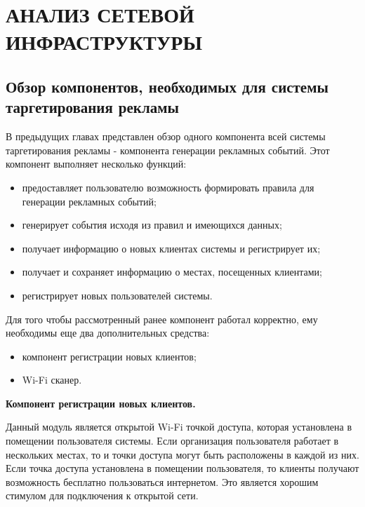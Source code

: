 \chapter{АНАЛИЗ СЕТЕВОЙ ИНФРАСТРУКТУРЫ}

\section{Обзор компонентов, необходимых для системы таргетирования рекламы}

В предыдущих главах представлен обзор одного компонента всей системы таргетирования рекламы - компонента генерации рекламных событий. Этот компонент выполняет несколько функций:

\begin{itemize}
	\item предоставляет пользователю возможность формировать правила для генерации рекламных событий;
	\item генерирует события исходя из правил и имеющихся данных;
	\item получает информацию о новых клиентах системы и регистрирует их;
	\item получает и сохраняет информацию о местах, посещенных клиентами;
	\item регистрирует новых пользователей системы.
\end{itemize}

Для того чтобы рассмотренный ранее компонент работал корректно, ему необходимы еще два дополнительных средства:

\begin{itemize}
	\item компонент регистрации новых клиентов;
	\item Wi-Fi сканер.
\end{itemize}

\textbf{Компонент регистрации новых клиентов.}

Данный модуль является открытой Wi-Fi точкой доступа, которая установлена в помещении пользователя системы. Если организация пользователя работает в нескольких местах, то и точки доступа могут быть расположены в каждой из них. Если точка доступа установлена в помещении пользователя, то клиенты получают возможность бесплатно пользоваться интернетом. Это является хорошим стимулом для подключения к открытой сети. 

